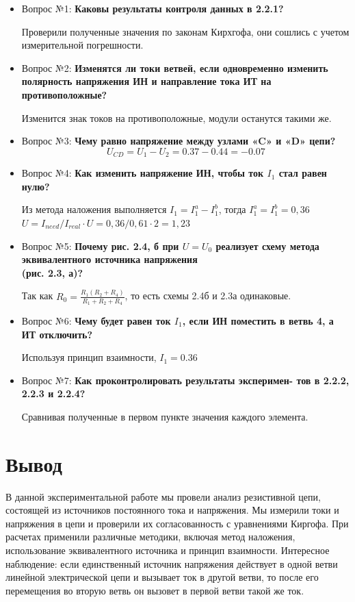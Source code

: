 \documentclass[a4paper,12pt]{report}
\begin{document}
\begin{itemize}
    \item Вопрос №1: \textbf{Каковы результаты контроля данных в 2.2.1?}
    \par Проверили полученные значения по законам Кирхгофа, они сошлись с учетом измерительной погрешности.
    \item Вопрос №2: \textbf{Изменятся ли токи ветвей, если одновременно изменить полярность напряжения ИН и направление тока ИТ на противоположные?}
    \par Изменится знак токов на противоположные, модули останутся такими же.
    \item Вопрос №3: \textbf{Чему равно напряжение между узлами «C» и «D» цепи?}
    \[ U_{CD} = U_1 - U_2 = 0.37 - 0.44 = -0.07 \]
    \item Вопрос №4: \textbf{Как изменить напряжение ИН, чтобы ток $I_1$ стал равен нулю?}
    \par 	Из метода наложения выполняется $I_1=I_1^a-I_1^b$, тогда $I_1^a=I_1^b=0,36$
    $U= I_{need}/I_{real} \cdot U = 0,36/0,61 \cdot 2=1,23$
    
    \item Вопрос №5: \textbf{Почему рис. 2.4, б при $U = U_0$
    реализует схему метода эквивалентного источника напряжения \\(рис. 2.3, а)?}
    \par Так как $R_0 = \frac{R_1(R_2+R_4)}{R_1+R_2+R_4}$, то есть схемы 2.4б и 2.3а одинаковые.
    \item Вопрос №6: \textbf{Чему будет равен ток $I_1$, если ИН поместить в
    ветвь 4, а ИТ отключить?}
    \par Используя принцип взаимности, $I_1 = 0.36$
    \item Вопрос №7: \textbf{Как проконтролировать результаты эксперимен-
    тов в 2.2.2, 2.2.3 и 2.2.4?}
    \par Сравнивая полученные в первом пункте значения каждого элемента.
    
\end{itemize}
\newpage
\section*{Вывод}
В данной экспериментальной работе мы провели анализ резистивной цепи, состоящей из источников постоянного тока и напряжения. Мы измерили токи и напряжения в цепи и проверили их согласованность с уравнениями Киргофа. При расчетах применили различные методики, включая метод наложения, использование эквивалентного источника и принцип взаимности. Интересное наблюдение: если единственный источник напряжения действует в одной ветви линейной электрической цепи и вызывает ток в другой ветви, то после его перемещения во вторую ветвь он вызовет в первой ветви такой же ток.
\newpage
\end{document}
